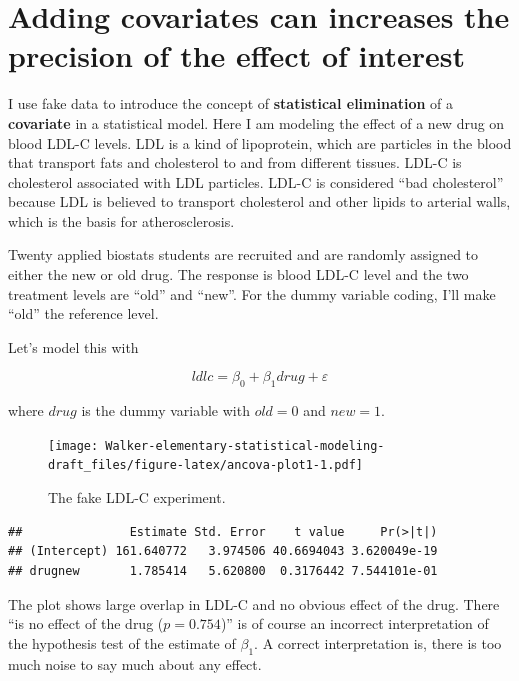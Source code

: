 \documentclass[]{book}
\begin{document}
\section{Adding covariates can increases the precision of the effect of
interest}\label{adding-covariates-can-increases-the-precision-of-the-effect-of-interest}

I use fake data to introduce the concept of \textbf{statistical
elimination} of a \textbf{covariate} in a statistical model. Here I am
modeling the effect of a new drug on blood LDL-C levels. LDL is a kind
of lipoprotein, which are particles in the blood that transport fats and
cholesterol to and from different tissues. LDL-C is cholesterol
associated with LDL particles. LDL-C is considered ``bad cholesterol''
because LDL is believed to transport cholesterol and other lipids to
arterial walls, which is the basis for atherosclerosis.

Twenty applied biostats students are recruited and are randomly assigned
to either the new or old drug. The response is blood LDL-C level and the
two treatment levels are ``old'' and ``new''. For the dummy variable
coding, I'll make ``old'' the reference level.

Let's model this with

\begin{equation}
ldlc = \beta_0 + \beta_1 drug + \varepsilon
\label{eq:ancova-1}
\end{equation}

where \(drug\) is the dummy variable with \(old=0\) and \(new=1\).

\begin{figure}
\centering
\texttt{[image: Walker-elementary-statistical-modeling-draft\_files/figure-latex/ancova-plot1-1.pdf]}
\caption{\label{fig:ancova-plot1}The fake LDL-C experiment.}
\end{figure}

\begin{verbatim}
##               Estimate Std. Error    t value     Pr(>|t|)
## (Intercept) 161.640772   3.974506 40.6694043 3.620049e-19
## drugnew       1.785414   5.620800  0.3176442 7.544101e-01
\end{verbatim}

The plot shows large overlap in LDL-C and no obvious effect of the drug.
There ``is no effect of the drug (\(p = 0.754\))'' is of course an
incorrect interpretation of the hypothesis test of the estimate of
\(\beta_1\). A correct interpretation is, there is too much noise to say
much about any effect.
\end{document}
